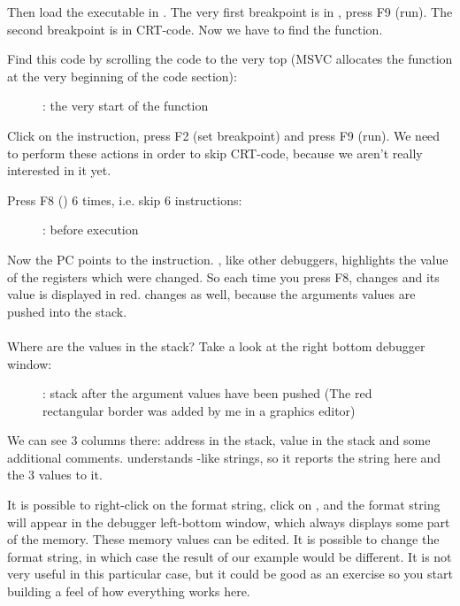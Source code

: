 Then load the executable in \olly.
The very first breakpoint is in , press 
F9 (run).
The second breakpoint is in \ac{CRT}-code.
Now we have to find the \main function.

Find this code by scrolling the code to the very top (MSVC allocates the \main function at the very beginning of the code section): 
\begin{figure}[H]
\centering
{}
\caption{\olly: the very start of the \main function}
\label{fig:printf3_olly_1}
\end{figure}

Click on the  instruction, press F2 (set breakpoint) and press F9 (run).
We need to perform these actions in order to skip \ac{CRT}-code, because we aren't really interested in it yet.

\clearpage
Press F8 (\stepover) 6 times, i.e. skip 6 instructions:

\begin{figure}[H]
\centering
{}
\caption{\olly: before \printf execution}
\label{fig:printf3_olly_2}
\end{figure}

Now the \ac{PC} points to the  instruction.
\olly, like other debuggers, highlights the value of the registers which were changed.
So each time you press F8, \EIP changes and its value is displayed in red.
\ESP changes as well, because the arguments values are pushed into the stack.\\
\\
Where are the values in the stack?
Take a look at the right bottom debugger window:

\begin{figure}[H]
\centering
{}
\caption{\olly: stack after the argument values have been pushed (The red rectangular border was added by me in a graphics editor)}
\end{figure}

We can see 3 columns there: address in the stack, value in the stack and some additional \olly comments. 
\olly understands \printf{}-like strings, so it reports the string here and the 3 values  to it.

It is possible to right-click on the format string, click on ,
and the format string will appear in the debugger left-bottom window, which always displays some part of the memory.
These memory values can be edited.
It is possible to change the format string, in which case the result of our example would be different.
It is not very useful in this particular case, but it could be good as an exercise so you start building a feel of how everything works here.


